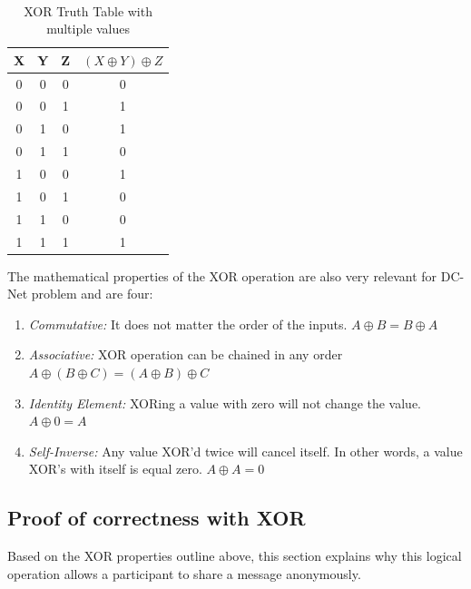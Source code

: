 \begin{table}[h!]
\centering
\caption{XOR Truth Table with multiple values}
~\\[0.5ex]
\begin{tabular}{|| c | c | c | c ||} 
 \hline
 X & Y & Z & $(X \oplus Y) \oplus Z$ \\ [0.ex] 
 \hline\hline
 0 & 0 & 0 & 0 \\ 
 0 & 0 & 1 & 1 \\
 0 & 1 & 0 & 1 \\
 0 & 1 & 1 & 0 \\
 1 & 0 & 0 & 1 \\
 1 & 0 & 1 & 0 \\
 1 & 1 & 0 & 0 \\ 
 1 & 1 & 1 & 1 \\ [1ex]
 \hline
\end{tabular}
\label{table:XORextended}
\end{table}

The mathematical properties of the XOR operation are also very relevant for DC-Net problem \cite{Lewin} and are four:
\begin{enumerate} \label{sec:XORproperties} \label{sec:xorproperties}
    \item \textit{Commutative:} It does not matter the order of the inputs. $A \oplus B = B \oplus A$
    \item \textit{Associative:} XOR operation can be chained in any order $A \oplus (B \oplus C) = (A \oplus B) \oplus C$
    \item \textit{Identity Element:} XORing a value with zero will not change the value. $A \oplus 0 = A$
    \item \textit{Self-Inverse:} Any value XOR'd twice will cancel itself. In other words, a value XOR's with itself is equal zero. $A \oplus A = 0$
\end{enumerate}

\subsection{Proof of correctness with XOR} \label{sec:xorDemonstration}
Based on the XOR properties outline above, this section explains why this logical operation allows a participant to share a message anonymously.



